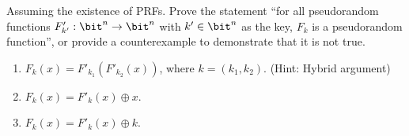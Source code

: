 \begin{problem}\label{p2}
    \leavevmode\par
    Assuming the existence of PRFs. Prove the statement ``for all pseudorandom functions $F'_{k'}:\bit^n\to \bit^n$ with $k'\in\bit^n$ as the key, $F_k$ is a pseudorandom function'', or provide a counterexample to demonstrate that it is not true.
    \begin{enumerate}[label=(\alph*)]
        \item  $F_k(x)= F'_{k_1}(F'_{k_2}(x))$, where $k=(k_1,k_2)$. (Hint: Hybrid argument)
        \item $F_k(x) = F'_k(x) \oplus x$.
        \item $F_k(x) = F'_k(x) \oplus k$.
    \end{enumerate}
\end{problem}

